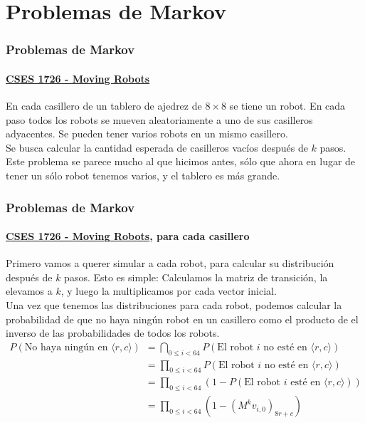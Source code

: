 \documentclass{beamer}
\begin{document}

\newcommand{\SECTIOND}{Problemas de Markov}
\section{\SECTIOND}
\newcommand{\EJD}{\href{https://cses.fi/problemset/view/1726/}{CSES 1726 - Moving Robots}}

\begin{frame}
  \frametitle{\SECTIOND}
  \framesubtitle{\EJD}

  En cada casillero de un tablero de ajedrez de \(8 \times 8\) se tiene un robot. En cada paso todos los robots se mueven aleatoriamente a uno de sus casilleros adyacentes. Se pueden tener varios robots en un mismo casillero. \\
  Se busca calcular la cantidad esperada de casilleros vacíos después de \(k\) pasos. \pause \\
  Este problema se parece mucho al que hicimos antes, sólo que ahora en lugar de tener un sólo robot tenemos varios, y el tablero es más grande.
\end{frame}

\begin{frame}
  \frametitle{\SECTIOND}
  \framesubtitle{\EJD, para cada casillero}

  Primero vamos a querer simular a cada robot, para calcular su distribución después de \(k\) pasos. \pause Esto es simple: Calculamos la matriz de transición, la elevamos a \(k\), y luego la multiplicamos por cada vector inicial. \pause \\
  Una vez que tenemos las distribuciones para cada robot, podemos calcular la probabilidad de que no haya ningún robot en un casillero como el producto de el inverso de las probabilidades de todos los robots. \pause
  \begin{align*}
    P(\text{No haya ningún en } \langle r, c \rangle) &= \bigcap_{0 \leq i < 64} P(\text{El robot } i \text{ no esté en } \langle r, c \rangle) \\
                                                      &= \prod_{0 \leq i < 64}P(\text{El robot } i \text{ no esté en } \langle r, c \rangle) \\
                                                      &= \prod_{0 \leq i < 64}(1 - P(\text{El robot } i \text{ esté en } \langle r, c \rangle)) \\
                                                      &= \prod_{0 \leq i < 64}(1 - (M^{k}v_{i,0})_{8r + c}) \\
  \end{align*}
\end{frame}
\end{document}

